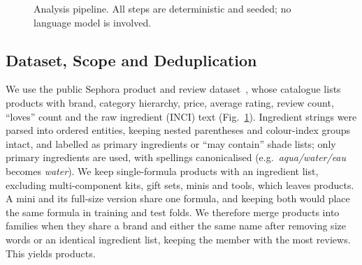 \documentclass[11pt,a4paper]{article}
\begin{document}
\begin{figure}[htbp]
\centering
{}
\caption{Analysis pipeline. All steps are deterministic and seeded; no language model is involved.}
\label{fig:pipeline}
\end{figure}

\subsection{Dataset, Scope and Deduplication}
We use the public Sephora product and review dataset~\cite{sephoradata}, whose catalogue lists \NCatalogue{} products with brand, category hierarchy, price, average rating, review count, ``loves'' count and the raw ingredient (INCI) text (Fig.~\ref{fig:pipeline}). Ingredient strings were parsed into ordered entities, keeping nested parentheses and colour-index groups intact, and labelled as primary ingredients or ``may contain'' shade lists; only primary ingredients are used, with spellings canonicalised (e.g.\ \emph{aqua/water/eau} becomes \emph{water}). We keep single-formula products with an ingredient list, excluding multi-component kits, gift sets, minis and tools, which leaves \NInScope{} products. A mini and its full-size version share one formula, and keeping both would place the same formula in training and test folds. We therefore merge products into families when they share a brand and either the same name after removing size words or an identical ingredient list, keeping the member with the most reviews. This yields \NAnalysed{} products.
\end{document}
